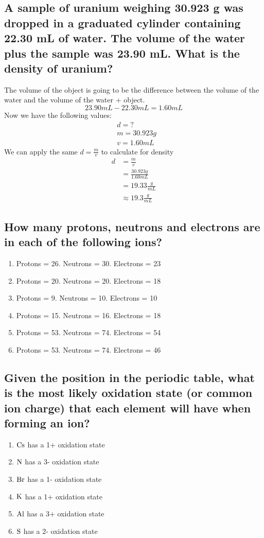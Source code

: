 \documentclass[11pt]{article}
\begin{document}
\subsection{A sample of uranium weighing 30.923 g was dropped in a graduated cylinder containing 22.30 mL of water. The volume of the water plus the sample was 23.90 mL. What is the density of uranium?}
\label{sec:org1dd3992}
The volume of the object is going to be the difference between the volume of the water and the volume of the water + object.
\begin{equation}
23.90mL - 22.30mL = 1.60mL
\end{equation}
Now we have the following values:
\begin{align*}
&d = ?\\
&m = 30.923g\\
&v = 1.60mL
\end{align*}
We can apply the same \(d=\frac{m}{v}\) to calculate for density
\begin{align*}
d&=\frac{m}{v} \\
            &=\frac{30.923g}{1.60mL}\\
            &=19.33\frac{g}{mL}\\
            &\approx19.3\frac{g}{mL}
\end{align*}

\subsection{How many protons, neutrons and electrons are in each of the following ions?}
\label{sec:org5abc155}
\begin{enumerate}
\item Protons = 26. Neutrons = 30. Electrons = 23
\item Protons = 20. Neutrons = 20. Electrons = 18
\item Protons = 9. Neutrons = 10. Electrons = 10
\item Protons = 15. Neutrons = 16. Electrons = 18
\item Protons = 53. Neutrons = 74. Electrons = 54
\item Protons = 53. Neutrons = 74. Electrons = 46
\end{enumerate}

\subsection{Given the position in the periodic table, what is the most likely oxidation state (or common ion charge) that each element will have when forming an ion?}
\label{sec:orge3de779}
\begin{enumerate}
\item \(\ce{Cs}\) has a 1+ oxidation state
\item \(\ce{N}\) has a 3- oxidation state
\item \(\ce{Br}\) has a 1- oxidation state
\item \(\ce{K}\) has a 1+ oxidation state
\item \(\ce{Al}\) has a 3+ oxidation state
\item \(\ce{S}\) has a 2- oxidation state
\end{enumerate}
\end{document}
